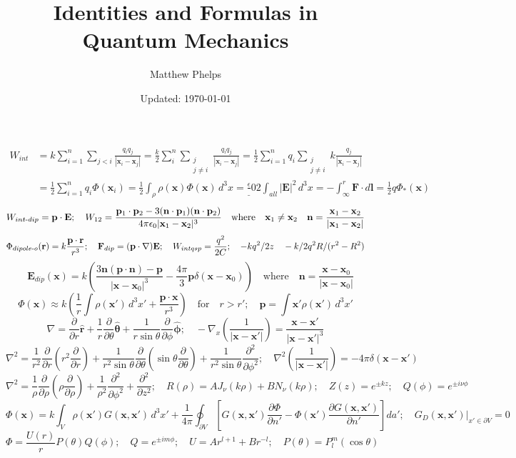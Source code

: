 \documentclass[9pt,letterpaper]{article}
\title{Identities and Formulas in Quantum Mechanics}
\author{Matthew Phelps}
\date{Updated: \today}
\newcommand{\vect}[1]{\mathbf{#1}}
\newcommand{\vecth}[1]{\hat{\mathbf{#1}}}
\newcommand{\epo}{\epsilon_0}
\newcommand{\pder}[2][]{\frac{\partial#1}{\partial#2}}
\begin{document}
\begin{align*}W_{int} &= k\sum_{i=1}^n\sum_{j<i}{\frac{q_iq_j}{|\vect x_i-\vect x_j|}}=\frac k2\sum_i^n\sum_{\substack{j\\j\neq i}}\frac{q_iq_j}{|\vect x_i-\vect x_j|}=\frac{1}{2}\sum_{i=1}^nq_i\sum_{\substack{j\\j\neq i}}k\frac{q_j}{|\vect x_i-\vect x_j|}\\
&=\frac 12\sum_{i=1}^nq_i\Phi(\vect x_i)=\frac 12\int_\rho{\rho(\vect x)\Phi(\vect x)\,d^3x}=\frac \epo2\int_{all}{|\vect E|^2\,d^3x}=-\int_\infty^r{\vect F\cdot d\vect l}=\frac 12 q\Phi_*(\vect x)
\end{align*}
$$W_{int\text -dip} = \vect p\cdot\vect E;\quad W_{12} = \frac{\vect p_1\cdot\vect p_2-3(\vect n\cdot \vect p_1)(\vect n\cdot\vect p_2)}{4\pi\epo|\vect x_1-\vect x_2|^3}\quad\text{where}\quad \vect x_1\neq\vect x_2\quad \vect n = \frac{\vect x_1-\vect x_2}{|\vect x_1-\vect x_2|}$$
$$\Phi_{dipole\text-o}(\vect r)=k\frac{\vect p\cdot\vect r}{r^3};\quad \vect F_{dip} = (\vect p\cdot\nabla)\vect E;\quad W_{intqsp}=\frac{q^2}{2C};\quad -kq^2/2z\quad -k/2q^2R/(r^2-R^2)$$
$$\quad \vect E_{dip}(\vect x) = k\left(\frac{3\vect n(\vect p\cdot\vect n)-\vect p}{|\vect x-\vect x_0|^3}-\frac{4\pi}{3}\vect p\delta(\vect x-\vect x_0)\right)\quad\text{where}\quad \vect n=\frac{\vect x-\vect x_0}{|\vect x-\vect x_0|}$$
$$\Phi(\vect x)\approx k\left(\frac{1}{r}\int{\rho(\vect x')\,d^3x'}+\frac{\vect p\cdot\vect x}{r^3}\right)\quad\text{for}\quad r>r';\quad\vect p = \int{\vect x'\rho(\vect x')\,d^3x'}$$
$$\nabla = \pder r\vecth r+\frac 1r\pder\theta\vecth\theta+\frac{1}{r\sin\theta}\pder\phi\vecth\phi;\quad-\nabla_x\left(\frac{1}{|\vect x-\vect x'|}\right)=\frac{\vect x-\vect x'}{|\vect x-\vect x'|^3}$$
$$\nabla^2 = \frac 1{r^2}\pder r\left(r^2\pder r\right)+\frac{1}{r^2\sin\theta}\pder\theta\left(\sin\theta\pder\theta\right)+\frac{1}{r^2\sin\theta}\frac{\partial^2}{\partial\phi^2};\quad\nabla^2\left(\frac{1}{|\vect x-\vect x'|}\right)=-4\pi\delta(\vect x-\vect x')$$
$$\nabla^2=\frac 1\rho\pder \rho\left(\rho\pder\rho\right)+\frac{1}{\rho^2}\frac{\partial^2}{\partial \phi^2}+\frac{\partial^2}{\partial z^2};\quad R(\rho) = AJ_\nu(k\rho)+BN_\nu(k\rho);\quad Z(z)=e^{\pm kz};\quad Q(\phi)=e^{\pm i\nu\phi}$$
$$\Phi(\vect x) = k\int_V\rho(\vect x')G(\vect x,\vect x')\,d^3x'+\frac{1}{4\pi}\oint_{\partial V}\left[G(\vect x,\vect x')\pder[\Phi]{n'}-\Phi(\vect x')\frac{\partial G(\vect x,\vect x')}{\partial n'} \right]da';\quad G_D(\vect x,\vect x')|_{x'\in\partial V}=0$$
$$\Phi = \frac{U(r)}{r}P(\theta)Q(\phi);\quad Q=e^{\pm im\phi};\quad U = Ar^{l+1}+Br^{-l};\quad P(\theta)=P_l^m(\cos\theta)$$
\end{document}
